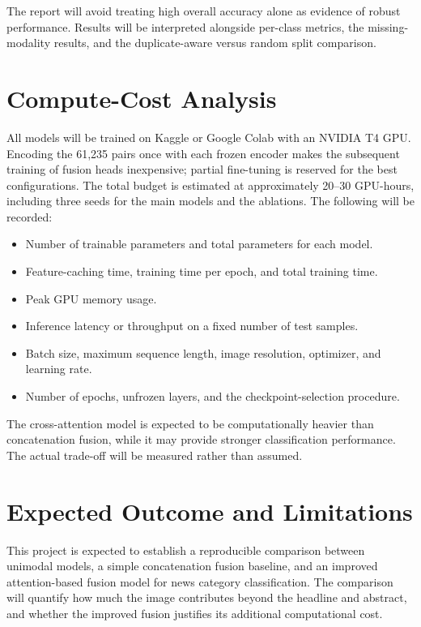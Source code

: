 \documentclass[11pt,a4paper]{article}
\begin{document}
The report will avoid treating high overall accuracy alone as evidence of robust performance. Results will be interpreted alongside per-class metrics, the missing-modality results, and the duplicate-aware versus random split comparison.

\section{Compute-Cost Analysis}

All models will be trained on Kaggle or Google Colab with an NVIDIA T4 GPU. Encoding the 61,235 pairs once with each frozen encoder makes the subsequent training of fusion heads inexpensive; partial fine-tuning is reserved for the best configurations. The total budget is estimated at approximately 20--30 GPU-hours, including three seeds for the main models and the ablations. The following will be recorded:

\begin{itemize}
\item Number of trainable parameters and total parameters for each model.
\item Feature-caching time, training time per epoch, and total training time.
\item Peak GPU memory usage.
\item Inference latency or throughput on a fixed number of test samples.
\item Batch size, maximum sequence length, image resolution, optimizer, and learning rate.
\item Number of epochs, unfrozen layers, and the checkpoint-selection procedure.
\end{itemize}

The cross-attention model is expected to be computationally heavier than concatenation fusion, while it may provide stronger classification performance. The actual trade-off will be measured rather than assumed.

\section{Expected Outcome and Limitations}

This project is expected to establish a reproducible comparison between unimodal models, a simple concatenation fusion baseline, and an improved attention-based fusion model for news category classification. The comparison will quantify how much the image contributes beyond the headline and abstract, and whether the improved fusion justifies its additional computational cost.
\end{document}
